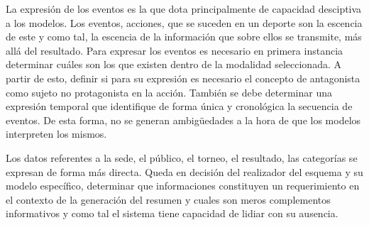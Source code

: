     La expresión de los eventos es la que dota principalmente de capacidad desciptiva a los modelos. Los eventos, acciones, que se suceden en un deporte son la escencia de 
este y como tal, la escencia de la información que sobre ellos se transmite, más allá del resultado. Para expresar los eventos es necesario en primera instancia determinar cuáles 
son los que existen dentro de la modalidad seleccionada. A partir de esto, definir si para su expresión es necesario el concepto de antagonista como sujeto no protagonista en la acción.
También se debe determinar una expresión temporal que identifique de forma única y cronológica la secuencia de eventos. De esta forma, no se generan ambigüedades a la hora de que los 
modelos interpreten los mismos.

    Los datos referentes a la sede, el público, el torneo, el resultado, las categorías se expresan de forma más directa. Queda en decisión del realizador del esquema y su modelo específico, 
determinar que informaciones constituyen un requerimiento en el contexto de la generación del resumen y cuales son meros complementos informativos y como tal el sistema tiene 
capacidad de lidiar con su ausencia. 

